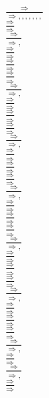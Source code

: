 \documentclass[11pt]{article}
\begin{document}
\begin{center}
\bigskip
\\$\frac{\Rightarrow }{\Rightarrow , , , , , , , }$
\bigskip
\\$\frac{\Rightarrow }{\Rightarrow }$
\bigskip
\\$\frac{\Rightarrow }{\Rightarrow , }$
\bigskip
\\$\frac{\Rightarrow }{\Rightarrow }$
\bigskip
\\$\frac{\Rightarrow }{\Rightarrow }$
\bigskip
\\$\frac{\Rightarrow }{\Rightarrow }$
\bigskip
\\$\frac{\Rightarrow }{\Rightarrow , }$
\bigskip
\\$\frac{\Rightarrow }{\Rightarrow }$
\bigskip
\\$\frac{\Rightarrow }{\Rightarrow }$
\bigskip
\\$\frac{\Rightarrow }{\Rightarrow }$
\bigskip
\\$\frac{\Rightarrow }{\Rightarrow , }$
\bigskip
\\$\frac{\Rightarrow }{\Rightarrow }$
\bigskip
\\$\frac{\Rightarrow }{\Rightarrow }$
\bigskip
\\$\frac{\Rightarrow }{\Rightarrow }$
\bigskip
\\$\frac{\Rightarrow }{\Rightarrow , }$
\bigskip
\\$\frac{\Rightarrow }{\Rightarrow }$
\bigskip
\\$\frac{\Rightarrow }{\Rightarrow }$
\bigskip
\\$\frac{\Rightarrow }{\Rightarrow }$
\bigskip
\\$\frac{\Rightarrow }{\Rightarrow , }$
\bigskip
\\$\frac{\Rightarrow }{\Rightarrow }$
\bigskip
\\$\frac{\Rightarrow }{\Rightarrow }$
\bigskip
\\$\frac{\Rightarrow }{\Rightarrow }$
\bigskip
\\$\frac{\Rightarrow }{\Rightarrow , }$
\bigskip
\\$\frac{\Rightarrow }{\Rightarrow }$
\bigskip
\\$\frac{\Rightarrow }{\Rightarrow }$
\bigskip
\\$\frac{\Rightarrow }{\Rightarrow }$
\bigskip
\\$\frac{\Rightarrow }{\Rightarrow , }$
\bigskip
\\$\frac{\Rightarrow }{\Rightarrow }$
\bigskip
\\$\frac{\Rightarrow }{\Rightarrow , }$
\bigskip
\\$\frac{\Rightarrow }{\Rightarrow }$

\end{center}
\end{document}
